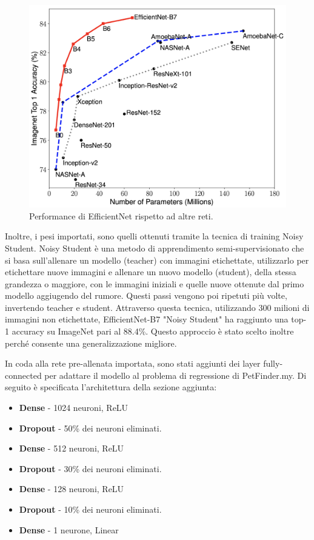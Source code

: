         \begin{figure}[H]
            \centering
            \includegraphics[scale=0.15]{Plot/efficientnet.png}
            \caption{Performance di EfficientNet rispetto ad altre reti.}
            \label{fig:efficientnet}
        \end{figure}
        
        Inoltre, i pesi importati, sono quelli ottenuti tramite la tecnica di training Noisy Student. Noisy Student è una metodo di apprendimento semi-supervisionato che si basa sull'allenare un modello (teacher) con immagini etichettate, utilizzarlo per etichettare nuove immagini e allenare un nuovo modello (student), della stessa grandezza o maggiore, con le immagini iniziali e quelle nuove ottenute dal primo modello aggiugendo del rumore. Questi passi vengono poi ripetuti più volte, invertendo teacher e student. Attraverso questa tecnica, utilizzando 300 milioni di immagini non etichettate, EfficientNet-B7 "Noisy Student" ha raggiunto una top-1 accuracy su ImageNet pari al 88.4\%. Questo approccio è stato scelto inoltre perché consente una generalizzazione migliore. \cite{xie2020selftraining}

        In coda alla rete pre-allenata importata, sono stati aggiunti dei layer fully-connected per adattare il modello al problema di regressione di PetFinder.my. Di seguito
        è specificata l'architettura della sezione aggiunta:
        \begin{itemize}
            \item \textbf{Dense} - 1024 neuroni, ReLU
            \item \textbf{Dropout} - 50\% dei neuroni eliminati.
            \item \textbf{Dense} - 512 neuroni, ReLU
            \item \textbf{Dropout} - 30\% dei neuroni eliminati.
            \item \textbf{Dense} - 128 neuroni, ReLU
            \item \textbf{Dropout} - 10\% dei neuroni eliminati.
            \item \textbf{Dense} - 1 neurone, Linear
        \end{itemize}

